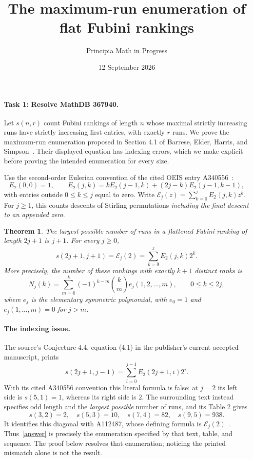 \documentclass[11pt]{article}
\title{The maximum-run enumeration of flat Fubini rankings}
\author{Principia Math in Progress}
\date{12 September 2026}
\newtheorem{theorem}{Theorem}
\newcommand{\E}{\mathcal E}
\begin{document}
\maketitle

\paragraph{Task 1: Resolve MathDB 367940.}
Let \(s(n,r)\) count Fubini rankings of length \(n\) whose maximal
strictly increasing runs have strictly increasing first entries,
with exactly \(r\) runs. We prove the maximum-run enumeration
proposed in Section 4.1 of Barrese, Elder, Harris, and Simpson~\cite{source}.
Their displayed equation has indexing errors, which we make explicit
before proving the intended enumeration for every size.

Use the second-order Eulerian convention of the cited OEIS entry
A340556~\cite{eulerian}:
\begin{equation}\label{erec}
 E_2(0,0)=1,\qquad
 E_2(j,k)=kE_2(j-1,k)+(2j-k)E_2(j-1,k-1),
\end{equation}
with entries outside \(0\le k\le j\) equal to zero.
Write \(\E_j(z)=\sum_{k=0}^jE_2(j,k)z^k\).
For \(j\ge1\), this counts descents of Stirling permutations
\emph{including the final descent to an appended zero}.

\begin{theorem}\label{main}
The largest possible number of runs in a flattened Fubini ranking
of length \(2j+1\) is \(j+1\). For every \(j\ge0\),
\begin{equation}\label{answer}
 \boxed{\quad s(2j+1,j+1)=\E_j(2)
             =\sum_{k=0}^j E_2(j,k)2^k.\quad}
\end{equation}
More precisely, the number of these rankings with exactly \(k+1\)
distinct ranks is
\begin{equation}\label{refinement}
 N_j(k)=\sum_{m=0}^k(-1)^{k-m}\binom{k}{m}e_j(1,2,\ldots,m),
 \qquad 0\le k\le2j,
\end{equation}
where \(e_j\) is the elementary symmetric polynomial, with
\(e_0=1\) and \(e_j(1,\ldots,m)=0\) for \(j>m\).
\end{theorem}

\paragraph{The indexing issue.}
The source's Conjecture 4.4, equation (4.1) in the publisher's current
accepted manuscript, prints
\[
 s(2j+1,j-1)=\sum_{i=0}^{j-1}E_2(2j+1,i)2^i.
\]
With its cited A340556 convention this literal formula is false:
at \(j=2\) its left side is \(s(5,1)=1\), whereas its right side
is \(2\). The surrounding text instead specifies odd length and
the \emph{largest possible} number of runs, and its Table 2 gives
\[
 s(3,2)=2,\quad s(5,3)=10,\quad s(7,4)=82,\quad s(9,5)=938.
\]
It identifies this diagonal with A112487, whose defining formula is
\(\E_j(2)\)~\cite{sequence}. Thus~\eqref{answer} is precisely the
enumeration specified by that text, table, and sequence. The proof
below resolves that enumeration; noticing the printed mismatch
alone is not the result.
\end{document}
